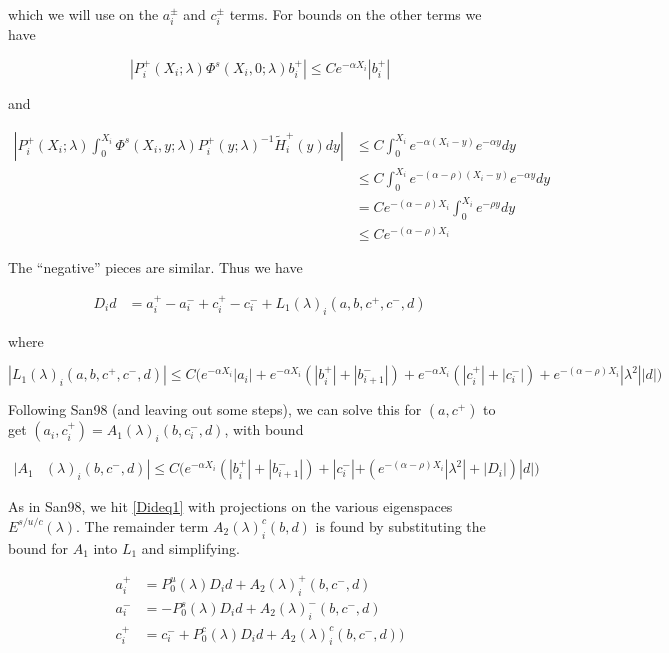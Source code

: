 \documentclass[12pt]{article}
\begin{document}
which we will use on the $a_i^\pm$ and $c_i^\pm$ terms. For bounds on the other terms we have

\[
|P_i^+(X_i; \lambda) \Phi^s(X_i, 0; \lambda)b_i^+| \leq C e^{-\alpha X_i} |b_i^+|
\]

and

\begin{align*}
\left|
P_i^+(X_i; \lambda) \int_0^{X_i} \Phi^s(X_i, y; \lambda) P_i^+(y; \lambda)^{-1} \tilde{H}_i^+(y) dy \right| 
&\leq C \int_0^{X_i} e^{-\alpha(X_i - y)}e^{-\alpha y} dy \\
&\leq C \int_0^{X_i} e^{-(\alpha - \rho)(X_i - y)}e^{-\alpha y} dy \\
&= C e^{-(\alpha - \rho) X_i} \int_0^{X_i} e^{-\rho y} dy \\ 
&\leq C e^{-(\alpha - \rho) X_i} 
\end{align*}

The ``negative'' pieces are similar. Thus we have

\begin{align}\label{Dideq1}
D_i d &= a_i^+ - a_i^- + c_i^+ - c_i^- + L_1(\lambda)_i(a, b, c^+, c^-, d)
\end{align}

where

\[
|L_1(\lambda)_i(a, b, c^+, c^-, d)| \leq C \Big( e^{-\alpha X_i} |a_i| + e^{-\alpha X_i} (|b_i^+| + |b_{i+1}^-|) + e^{-\alpha X_i} (|c_i^+| + |c_i^-|) + e^{-(\alpha - \rho) X_i} |\lambda^2| |d| \Big)
\]

Following San98 (and leaving out some steps), we can solve this for $(a, c^+)$ to get $(a_i, c_i^+) = A_1(\lambda)_i(b, c_i^-, d)$, with bound

\begin{align*}
|A_1&(\lambda)_i(b, c^-, d)|
\leq C \Big( e^{-\alpha X_i} (|b_i^+| + |b_{i+1}^-|) + |c_i^-| + (e^{-(\alpha - \rho) X_i} |\lambda^2| + |D_i|)|d| \Big)
\end{align*} 

As in San98, we hit \eqref{Dideq1} with projections on the various eigenspaces $E^{s/u/c}(\lambda)$. The remainder term $A_2(\lambda)_i^c(b, d)$ is found by substituting the bound for $A_1$ into $L_1$ and simplifying.

\begin{align*}
a_i^+ &= P_0^u(\lambda) D_i d + A_2(\lambda)_i^+(b, c^-, d) \\
a_i^- &= -P_0^s(\lambda) D_i d + A_2(\lambda)_i^-(b, c^-, d) \\
c_i^+ &= c_i^- + P_0^c(\lambda) D_i d + A_2(\lambda)_i^c(b, c^-, d) )
\end{align*}
\end{document}
